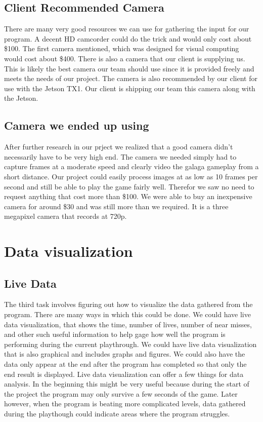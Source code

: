 \documentclass{scrreprt}
\begin{document}
\subsection{Client Recommended Camera}
There are many very good resources we can use for gathering the input for our program.
A decent HD camcorder could do the trick and would only cost about \$100.
The first camera mentioned, which was designed for visual computing would cost about \$400.
There is also a camera that our client is supplying us.
This is likely the best camera our team should use since it is provided freely and meets the needs of our project.
The camera is also recommended by our client for use with the Jetson TX1.
Our client is shipping our team this camera along with the Jetson.

\subsection{Camera we ended up using}
After further research in our prject we realized that a good camera didn't necessarily have to be very high end.
The camera we needed simply had to capture frames at a moderate speed and clearly video the galaga gameplay from a short distance.
Our project could easily process images at as low as 10 frames per second and still be able to play the game fairly well.
Therefor we saw no need to request anything that cost more than \$100.
We were able to buy an inexpensive camera for around \$30 and was still more than we required.
It is a three megapixel camera that records at 720p.

\section{Data visualization}
\subsection{Live Data}
The third task involves figuring out how to visualize the data gathered from the program.
There are many ways in which this could be done.
We could have live data visualization, that shows the time, number of lives, number of near misses, and other such useful information to help gage how well the program is performing during the current playthrough.
We could have live data visualization that is also graphical and includes graphs and figures.
We could also have the data only appear at the end after the program has completed so that only the end result is displayed.
Live data visualization can offer a few things for data analysis.
In the beginning this might be very useful because during the start of the project the program may only survive a few seconds of the game.
Later however, when the program is beating more complicated levels, data gathered during the playthough could indicate areas where the program struggles.
\end{document}
